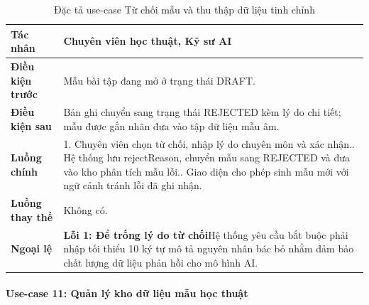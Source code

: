 \begingroup
\small
\begin{longtable}{|p{3.2cm}|p{\dimexpr\linewidth-3.2cm-4\tabcolsep-3\arrayrulewidth\relax}|}
\caption{Đặc tả use-case Từ chối mẫu và thu thập dữ liệu tinh chỉnh}
\label{aihub:tab:uc_academic_reject}\\
\hline
\textbf{Tác nhân} & Chuyên viên học thuật, Kỹ sư AI \\ \hline
\textbf{Điều kiện trước} & Mẫu bài tập đang mở ở trạng thái DRAFT. \\ \hline
\textbf{Điều kiện sau} & Bản ghi chuyển sang trạng thái REJECTED kèm lý do chi tiết; mẫu được gắn nhãn đưa vào tập dữ liệu mẫu âm. \\ \hline
\textbf{Luồng chính} & 1. Chuyên viên chọn từ chối, nhập lý do chuyên môn và xác nhận.\newline 2. Hệ thống lưu rejectReason, chuyển mẫu sang REJECTED và đưa vào kho phân tích mẫu lỗi.\newline 3. Giao diện cho phép sinh mẫu mới với ngữ cảnh tránh lỗi đã ghi nhận. \\ \hline
\textbf{Luồng thay thế} & Không có. \\ \hline
\textbf{Ngoại lệ} &
\textbf{Lỗi 1: Để trống lý do từ chối}\newline Hệ thống yêu cầu bắt buộc phải nhập tối thiểu 10 ký tự mô tả nguyên nhân bác bỏ nhằm đảm bảo chất lượng dữ liệu phản hồi cho mô hình AI. \\ \hline
\end{longtable}
\endgroup

\paragraph{Use-case 11: Quản lý kho dữ liệu mẫu học thuật}

